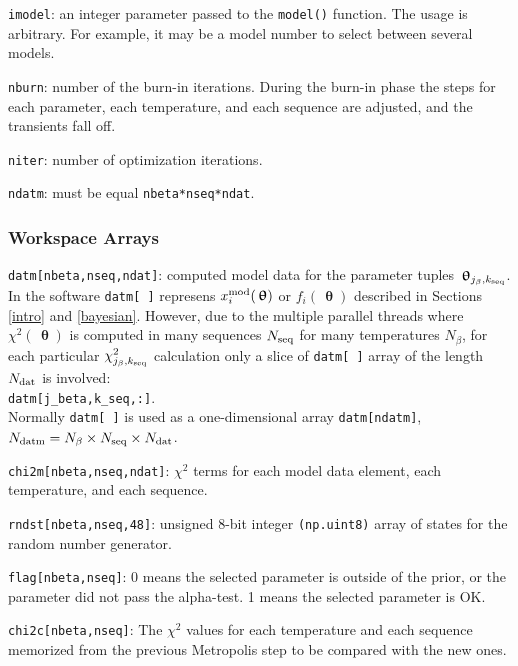 \documentclass[preprint2]{aastex}
\newcommand{\bfth}{\,\bm{\uptheta}}
\begin{document}
\verb|imodel|: an integer parameter passed to the \verb|model()| function. The usage is
        arbitrary. For example, it may be a model number to select between
        several models.

\verb|nburn|: number of the burn-in iterations. During the burn-in phase the steps
       for each parameter, each temperature, and each sequence are adjusted,
       and the transients fall off.

\verb|niter|: number of optimization iterations.

\verb|ndatm|: must be equal \verb|nbeta*nseq*ndat|.



\subsubsection{Workspace Arrays}

\verb|datm[nbeta,nseq,ndat]|: computed model data for the parameter tuples 
							  $\bfth_{j_\beta, k_{\rm seq}}$. 
							  In the software \verb|datm[ ]|
							  represens $x^{\rm mod}_i(\bfth)$ or $f_i(\bfth)$ described
							  in Sections \ref{intro} and \ref{bayesian}. However,
							  due to the multiple parallel threads where $\chi^2(\bfth)$
							  is computed  in many sequences $N_{\rm seq}$ for many 
							  temperatures $N_\beta$, for each particular 
							  $\chi^2_{j_\beta, k_{\rm seq}}$ calculation only a slice 
							  of \verb|datm[ ]| array of the length $N_{\rm dat}$ is
							  involved: \\
							  \verb|datm[j_beta,k_seq,:]|. \\
							  Normally \verb|datm[ ]| is used as a one-dimensional
							  array \verb|datm[ndatm]|, 
							  $N_{\rm datm} = N_\beta \times N_{\rm seq} \times N_{\rm dat}$.

\verb|chi2m[nbeta,nseq,ndat]|: $\chi^2$ terms for each model data element, each
                        temperature, and each sequence.

\verb|rndst[nbeta,nseq,48]|: unsigned 8-bit integer \verb|(np.uint8)| array of states
                      for the random number generator.

\verb|flag[nbeta,nseq]|: 0 means the selected parameter is outside of the prior,
                  or the parameter did not pass the alpha-test.
                  1 means the selected parameter is OK.
                  
\verb|chi2c[nbeta,nseq]|: The $\chi^2$ values for each temperature and each sequence 
                          memorized from the previous Metropolis step to be compared
                          with the new ones.
\end{document}
